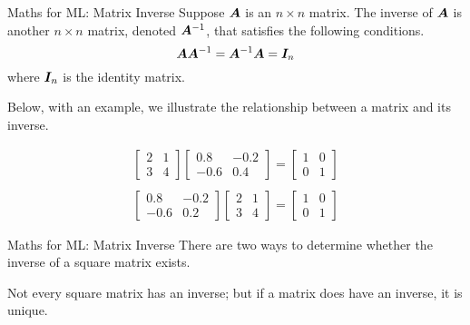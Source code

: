 \documentclass{beamer}
\begin{document}
\begin{frame}{Maths for ML: Matrix Inverse}
Suppose $\bm{A}$ is an $n \times n$ matrix. The inverse of $\bm{A}$ is another $n \times n$ matrix, denoted $\bm{A}^{-1}$, that satisfies the following conditions.
\[
\bm{A}\bm{A}^{-1}=\bm{A}^{-1} \bm{A}=\bm{I}_n
\]
where $\bm{I}_n$ is the identity matrix.

\pause  Below, with an example, we illustrate the relationship between a matrix and its inverse.

\pause \[
\begin{array}{l}
{\left[\begin{array}{cc}
	{2} & {1} \\
	{3} & {4}
	\end{array}\right]\left[\begin{array}{cc}
	{0.8} & {-0.2} \\
	{-0.6} & {0.4}
	\end{array}\right]=\left[\begin{array}{ll}
	{1} & {0} \\
	{0} & {1}
	\end{array}\right]} \\ \\
{\left[\begin{array}{cc}
	{0.8} & {-0.2} \\
	{-0.6} & {0.2}
	\end{array}\right]\left[\begin{array}{ll}
	{2} & {1} \\
	{3} & {4}
	\end{array}\right]=\left[\begin{array}{ll}
	{1} & {0} \\
	{0} & {1}
	\end{array}\right]}
\end{array}
\]

\end{frame}

\begin{frame}{Maths for ML: Matrix Inverse}
There are two ways to determine whether the inverse of a square matrix exists.

 {Not every square matrix has an inverse; but if a matrix does have an inverse, it is unique.}
\end{frame}
\end{document}
